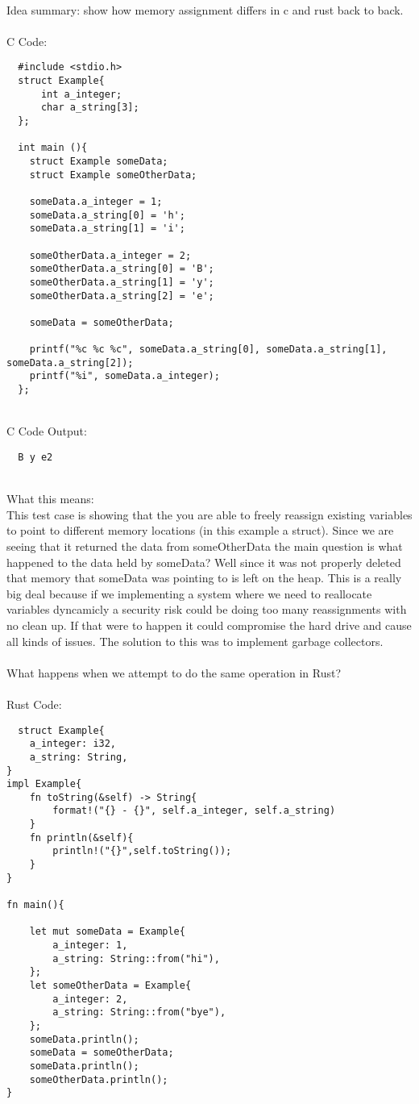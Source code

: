 \documentclass{article}
\theoremstyle{theorem}
\theoremstyle{definition}
\theoremstyle{remark}
\begin{document}
\\Idea summary: show how memory assignment differs in c and rust back to back.
\\
\\C Code:
\begin{lstlisting}
  #include <stdio.h>
  struct Example{
      int a_integer;
      char a_string[3];
  };
  
  int main (){
    struct Example someData;
    struct Example someOtherData;
    
    someData.a_integer = 1;
    someData.a_string[0] = 'h';
    someData.a_string[1] = 'i';
  
    someOtherData.a_integer = 2;
    someOtherData.a_string[0] = 'B';
    someOtherData.a_string[1] = 'y';
    someOtherData.a_string[2] = 'e';
  
    someData = someOtherData;
  
    printf("%c %c %c", someData.a_string[0], someData.a_string[1], someData.a_string[2]);
    printf("%i", someData.a_integer);
  };
  \end{lstlisting}
\\C Code Output:
\begin{lstlisting}
  B y e2
\end{lstlisting}
\\What this means:
\\This test case is showing that the you are able to freely reassign existing variables to point to different memory locations (in this example a struct).
Since we are seeing that it returned the data from someOtherData the main question is what happened to the data held by someData? Well since it was not properly deleted that memory that someData was pointing to is left on the heap.
This is a really big deal because if we implementing a system where we need to reallocate variables dyncamicly a security risk could be doing too many reassignments with no clean up.
If that were to happen it could compromise the hard drive and cause all kinds of issues. The solution to this was to implement garbage collectors.
\\
\\What happens when we attempt to do the same operation in Rust?
\\
\\Rust Code:
\begin{lstlisting}
  struct Example{
    a_integer: i32,
    a_string: String, 
}
impl Example{
    fn toString(&self) -> String{
        format!("{} - {}", self.a_integer, self.a_string)
    }
    fn println(&self){
        println!("{}",self.toString());
    }
}

fn main(){

    let mut someData = Example{
        a_integer: 1,
        a_string: String::from("hi"),
    };
    let someOtherData = Example{
        a_integer: 2,
        a_string: String::from("bye"),
    }; 
    someData.println();
    someData = someOtherData;
    someData.println();
    someOtherData.println();
}
  \end{lstlisting}
\end{document}
